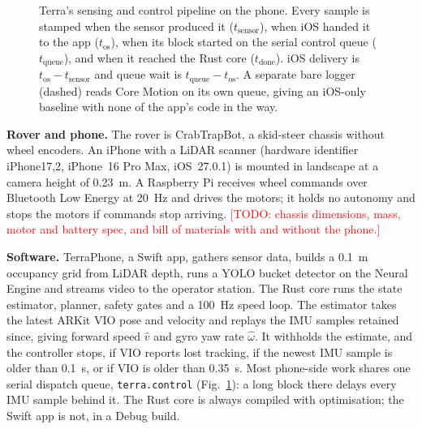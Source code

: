 \documentclass[conference]{IEEEtran}
\newcommand{\todo}[1]{\textcolor{red}{[TODO: #1]}}
\newcommand{\tsens}{t_{\text{sensor}}}
\newcommand{\tos}{t_{\text{os}}}
\newcommand{\tqueue}{t_{\text{queue}}}
\newcommand{\tdone}{t_{\text{done}}}
\begin{document}
\begin{figure}[t]
\caption{Terra's sensing and control pipeline on the phone. Every sample is stamped when the sensor produced it ($\tsens$), when iOS handed it to the app ($\tos$), when its block started on the serial control queue ($\tqueue$), and when it reached the Rust core ($\tdone$). iOS delivery is $\tos-\tsens$ and queue wait is $\tqueue-\tos$. A separate bare logger (dashed) reads Core Motion on its own queue, giving an iOS-only baseline with none of the app's code in the way.}
\label{fig:pipeline}
\end{figure}

\textbf{Rover and phone.}
The rover is CrabTrapBot, a skid-steer chassis without wheel encoders.
An iPhone with a LiDAR scanner (hardware identifier iPhone17,2, iPhone~16 Pro Max, iOS~27.0.1) is mounted in landscape at a camera height of 0.23~m.
A Raspberry Pi receives wheel commands over Bluetooth Low Energy at 20~Hz and drives the motors; it holds no autonomy and stops the motors if commands stop arriving.
\todo{chassis dimensions, mass, motor and battery spec, and bill of materials with and without the phone.}

\textbf{Software.}
TerraPhone, a Swift app, gathers sensor data, builds a 0.1~m occupancy grid from LiDAR depth, runs a YOLO bucket detector on the Neural Engine and streams video to the operator station.
The Rust core runs the state estimator, planner, safety gates and a 100~Hz speed loop.
The estimator takes the latest ARKit VIO pose and velocity and replays the IMU samples retained since, giving forward speed $\hat v$ and gyro yaw rate $\hat\omega$.
It withholds the estimate, and the controller stops, if VIO reports lost tracking, if the newest IMU sample is older than 0.1~s, or if VIO is older than 0.35~s.
Most phone-side work shares one serial dispatch queue, \texttt{terra.control} (Fig.~\ref{fig:pipeline}): a long block there delays every IMU sample behind it.
The Rust core is always compiled with optimisation; the Swift app is not, in a Debug build.

\end{document}
